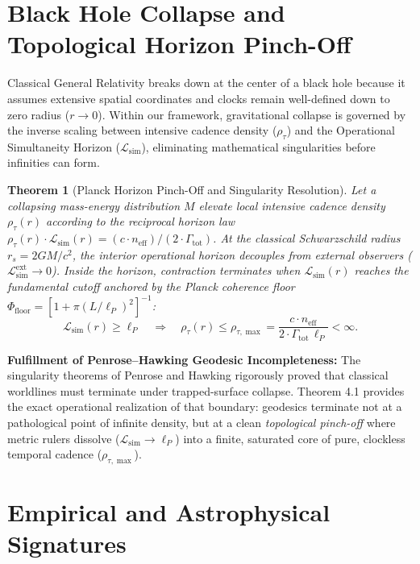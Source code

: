 \documentclass[11pt,a4paper]{article}
\newtheorem{theorem}{Theorem}[section]
\begin{document}
\section{Black Hole Collapse and Topological Horizon Pinch-Off}

Classical General Relativity breaks down at the center of a black hole because it assumes extensive spatial coordinates and clocks remain well-defined down to zero radius ($r \to 0$). Within our framework, gravitational collapse is governed by the inverse scaling between intensive cadence density ($\rho_\tau$) and the Operational Simultaneity Horizon ($\mathcal{L}_{\mathrm{sim}}$), eliminating mathematical singularities before infinities can form.

\begin{theorem}[Planck Horizon Pinch-Off and Singularity Resolution]
Let a collapsing mass-energy distribution $M$ elevate local intensive cadence density $\rho_\tau(r)$ according to the reciprocal horizon law $\rho_\tau(r) \cdot \mathcal{L}_{\mathrm{sim}}(r) = (c \cdot n_{\mathrm{eff}}) / (2 \cdot \Gamma_{\mathrm{tot}})$. At the classical Schwarzschild radius $r_s = 2GM/c^2$, the interior operational horizon decouples from external observers ($\mathcal{L}_{\mathrm{sim}}^{\mathrm{ext}} \to 0$). Inside the horizon, contraction terminates when $\mathcal{L}_{\mathrm{sim}}(r)$ reaches the fundamental cutoff anchored by the Planck coherence floor $\Phi_{\mathrm{floor}} = [1 + \pi(L/\ell_P)^2]^{-1}$:
\begin{equation}
\mathcal{L}_{\mathrm{sim}}(r) \geq \ell_P \quad \Longrightarrow \quad \rho_\tau(r) \leq \rho_{\tau,\max} = \frac{c \cdot n_{\mathrm{eff}}}{2 \cdot \Gamma_{\mathrm{tot}} \, \ell_P} < \infty.
\end{equation}
\end{theorem}

\noindent\textbf{Fulfillment of Penrose--Hawking Geodesic Incompleteness:} The singularity theorems of Penrose and Hawking \cite{Penrose1965,HawkingPenrose1970} rigorously proved that classical worldlines must terminate under trapped-surface collapse. Theorem 4.1 provides the exact operational realization of that boundary: geodesics terminate not at a pathological point of infinite density, but at a clean \emph{topological pinch-off} where metric rulers dissolve ($\mathcal{L}_{\mathrm{sim}} \to \ell_P$) into a finite, saturated core of pure, clockless temporal cadence ($\rho_{\tau,\max}$).

\section{Empirical and Astrophysical Signatures}
\end{document}
